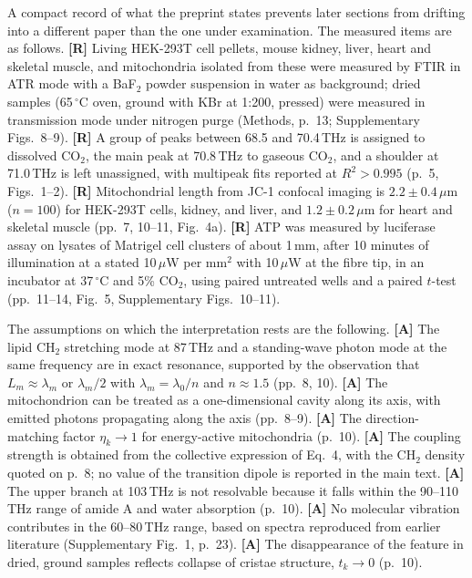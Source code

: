 \documentclass[11pt]{article}
\newcommand{\stR}{\textbf{\textcolor{blue!55!black}{[R]}}}
\newcommand{\stA}{\textbf{\textcolor{orange!70!black}{[A]}}}
\theoremstyle{plain}
\theoremstyle{definition}
\theoremstyle{remark}
\begin{document}
A compact record of what the preprint states prevents later sections from drifting into a different paper than the one under examination. The measured items are as follows. \stR{} Living HEK-293T cell pellets, mouse kidney, liver, heart and skeletal muscle, and mitochondria isolated from these were measured by FTIR in ATR mode with a BaF$_2$ powder suspension in water as background; dried samples (65\,$^\circ$C oven, ground with KBr at 1:200, pressed) were measured in transmission mode under nitrogen purge (Methods, p.~13; Supplementary Figs.~8--9). \stR{} A group of peaks between 68.5 and 70.4\,THz is assigned to dissolved CO$_2$, the main peak at 70.8\,THz to gaseous CO$_2$, and a shoulder at 71.0\,THz is left unassigned, with multipeak fits reported at $R^2>0.995$ (p.~5, Figs.~1--2). \stR{} Mitochondrial length from JC-1 confocal imaging is $2.2\pm0.4\,\mu\mathrm{m}$ ($n=100$) for HEK-293T cells, kidney, and liver, and $1.2\pm0.2\,\mu\mathrm{m}$ for heart and skeletal muscle (pp.~7, 10--11, Fig.~4a). \stR{} ATP was measured by luciferase assay on lysates of Matrigel cell clusters of about 1\,mm, after 10 minutes of illumination at a stated 10\,$\mu$W per mm$^2$ with 10\,$\mu$W at the fibre tip, in an incubator at 37\,$^\circ$C and 5\% CO$_2$, using paired untreated wells and a paired $t$-test (pp.~11--14, Fig.~5, Supplementary Figs.~10--11).

The assumptions on which the interpretation rests are the following. \stA{} The lipid CH$_2$ stretching mode at 87\,THz and a standing-wave photon mode at the same frequency are in exact resonance, supported by the observation that $L_m\approx\lambda_m$ or $\lambda_m/2$ with $\lambda_m=\lambda_0/n$ and $n\approx1.5$ (pp.~8, 10). \stA{} The mitochondrion can be treated as a one-dimensional cavity along its axis, with emitted photons propagating along the axis (pp.~8--9). \stA{} The direction-matching factor $\eta_k\to1$ for energy-active mitochondria (p.~10). \stA{} The coupling strength is obtained from the collective expression of Eq.~4, with the CH$_2$ density quoted on p.~8; no value of the transition dipole is reported in the main text. \stA{} The upper branch at 103\,THz is not resolvable because it falls within the 90--110\,THz range of amide A and water absorption (p.~10). \stA{} No molecular vibration contributes in the 60--80\,THz range, based on spectra reproduced from earlier literature (Supplementary Fig.~1, p.~23). \stA{} The disappearance of the feature in dried, ground samples reflects collapse of cristae structure, $t_k\to0$ (p.~10).
\end{document}
